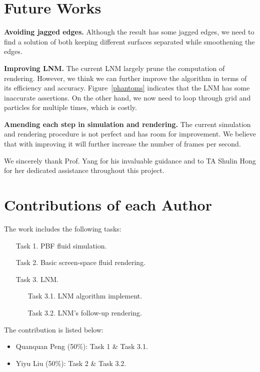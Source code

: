 \documentclass[sigconf]{acmart}
\begin{document}
\section{Future Works}

\textbf{Avoiding jagged edges.} Although the result has some jagged edges, we need to find a solution of both keeping different surfaces separated while smoothening the edges.

\textbf{Improving LNM.} The current LNM largely prune the computation of rendering. However, we think we can further improve the algorithm in terms of its efficiency and accuracy. Figure~\ref{phantoms} indicates that the LNM has some inaccurate assertions. On the other hand, we now need to loop through grid and particles for multiple times, which is costly.

\textbf{Amending each step in simulation and rendering.} The current simulation and rendering procedure is not perfect and has room for improvement. We believe that with improving it will further increase the number of frames per second.


\begin{acks}
We sincerely thank Prof. Yang for his invaluable guidance and to TA Shulin Hong for her dedicated assistance throughout this project.
\end{acks}





\appendix

\section{Contributions of each Author}
The work includes the following tasks:
\begin{enumerate}
  \item [Task 1.] PBF fluid simulation.
  \item [Task 2.] Basic screen-space fluid rendering.
  \item [Task 3.] LNM.
  \begin{enumerate}
    \item [Task 3.1.] LNM algorithm implement.
    \item [Task 3.2.] LNM's follow-up rendering.
  \end{enumerate}
\end{enumerate}

The contribution is listed below:
\begin{itemize}
  \item Quanquan Peng (50\%): Task 1 \& Task 3.1.
  \item Yiyu Liu (50\%): Task 2 \& Task 3.2.
\end{itemize}
\end{document}

